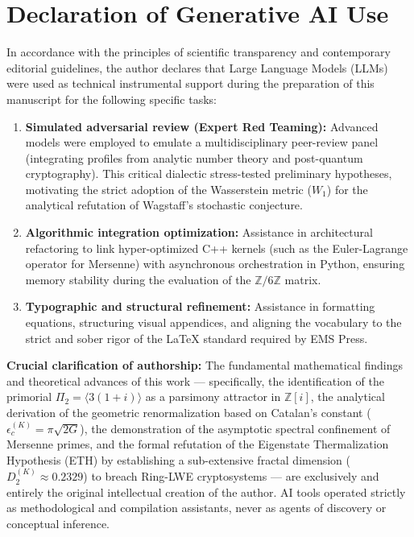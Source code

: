 \documentclass{article}
\numberwithin{equation}{section}
\theoremstyle{plain}
\theoremstyle{definition}
\begin{document}
\section*{Declaration of Generative AI Use}
In accordance with the principles of scientific transparency and contemporary editorial guidelines, the author declares that Large Language Models (LLMs) were used as technical instrumental support during the preparation of this manuscript for the following specific tasks:

\begin{enumerate}
    \item \textbf{Simulated adversarial review (Expert Red Teaming):} Advanced models were employed to emulate a multidisciplinary peer-review panel (integrating profiles from analytic number theory and post-quantum cryptography). This critical dialectic stress-tested preliminary hypotheses, motivating the strict adoption of the Wasserstein metric ($W_1$) for the analytical refutation of Wagstaff's stochastic conjecture.
    \item \textbf{Algorithmic integration optimization:} Assistance in architectural refactoring to link hyper-optimized C++ kernels (such as the Euler-Lagrange operator for Mersenne) with asynchronous orchestration in Python, ensuring memory stability during the evaluation of the $\mathbb{Z}/6\mathbb{Z}$ matrix.
    \item \textbf{Typographic and structural refinement:} Assistance in formatting equations, structuring visual appendices, and aligning the vocabulary to the strict and sober rigor of the LaTeX standard required by EMS Press.
\end{enumerate}

\textbf{Crucial clarification of authorship:} The fundamental mathematical findings and theoretical advances of this work — specifically, the identification of the primorial $\Pi_2 = \langle 3(1+i) \rangle$ as a parsimony attractor in $\mathbb{Z}[i]$, the analytical derivation of the geometric renormalization based on Catalan's constant ($\epsilon_c^{(K)} = \pi\sqrt{2G}$), the demonstration of the asymptotic spectral confinement of Mersenne primes, and the formal refutation of the Eigenstate Thermalization Hypothesis (ETH) by establishing a sub-extensive fractal dimension ($D_2^{(K)} \approx 0.2329$) to breach Ring-LWE cryptosystems — are exclusively and entirely the original intellectual creation of the author. AI tools operated strictly as methodological and compilation assistants, never as agents of discovery or conceptual inference.
\end{document}
